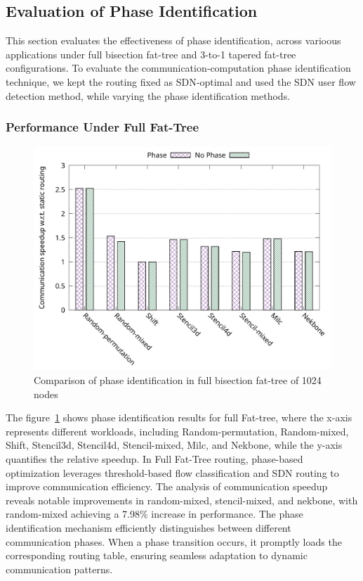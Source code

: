 \subsection{Evaluation of Phase Identification}
This section evaluates the effectiveness of phase identification, across varioous applications under full bisection fat-tree and 3-to-1 tapered fat-tree configurations. To evaluate the communication‑computation phase identification technique, we kept the routing fixed as SDN‑optimal and used the SDN user flow detection method, while varying the phase identification methods.

\subsubsection{Performance Under Full Fat-Tree}


\begin{figure}[h]
  \centering
  \includegraphics[width=\columnwidth]{./figs_4/phase_full.pdf}
  \caption{Comparison of phase identification in full bisection fat-tree of 1024 nodes}
  \label{fig:phase_full}
\end{figure}
The figure~\ref{fig:phase_full} shows phase identification results for full Fat-tree, where the x-axis represents different workloads, including Random-permutation, Random-mixed, Shift, Stencil3d, Stencil4d, Stencil-mixed, Milc, and Nekbone, while the y-axis quantifies the relative speedup. 
In Full Fat-Tree routing, phase-based optimization leverages threshold-based flow classification and SDN routing to improve communication efficiency. The analysis of communication speedup reveals notable improvements in random-mixed, stencil-mixed, and nekbone, with random-mixed achieving a 7.98\% increase in performance. The phase identification mechanism efficiently distinguishes between different communication phases. When a phase transition occurs, it promptly loads the corresponding routing table, ensuring seamless adaptation to dynamic communication patterns.

